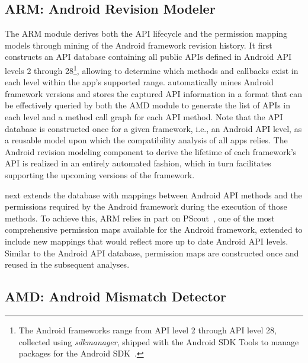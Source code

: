 \subsection{ARM: Android Revision Modeler} 

The ARM module derives both the API lifecycle and the permission mapping models through mining of the Android framework revision history.
It first constructs an API database containing all public APIs defined in Android API levels 2 through 28\footnote{The Android frameworks range from API level 2 through API level 28, collected using {\it sdkmanager}, shipped with the Android SDK Tools to manage packages for the Android SDK~\cite{sdkmanager}. }, allowing \@approach to determine which methods and callbacks exist in each level within the app's supported range. \@approach automatically mines Android framework versions and stores the captured API information in a format that can be effectively queried by both the AMD module to generate the list of APIs in each level and a method call graph for each API method.
Note that the API database is constructed once for a given framework, i.e., an Android API level, as a reusable model upon which the compatibility analysis of all apps relies.
The Android revision modeling component to derive the lifetime of each framework's API is realized in an entirely automated fashion, which in turn facilitates supporting the upcoming versions of the framework. %



 \@approach next extends the database with mappings between Android API methods and the permissions required by the Android framework during the execution of those methods. To achieve this, ARM relies in part on PScout~\cite{au2012pscout}, one of the most comprehensive permission maps available for the Android framework,%
 extended to include new mappings that would reflect more up to date Android API levels. Similar to the Android API database, permission maps are constructed once and reused in the subsequent analyses.
 

  

 
 
\subsection{AMD: Android Mismatch Detector} 
\label{mismatchdetection}


